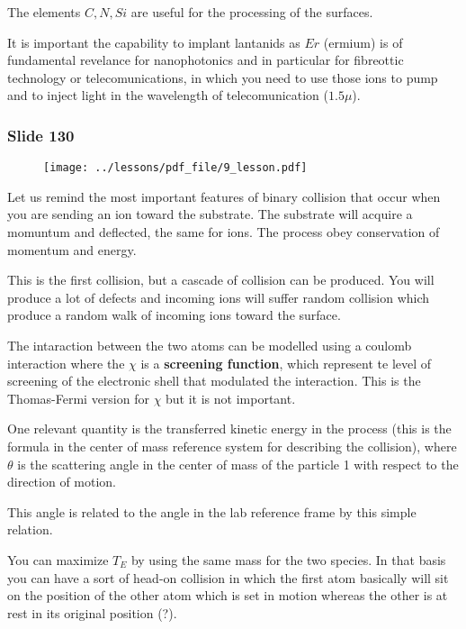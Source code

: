 \documentclass[../main/main.tex]{subfiles}
\begin{document}
The elements \( C,N,Si \) are useful for the processing of the surfaces.

It is important the capability to implant lantanids as \( Er \) (ermium) is of fundamental revelance for nanophotonics and in particular for fibreottic technology or telecomunications, in which you need to use those ions to pump and to inject light in the wavelength of telecomunication (\( 1.5 \mu \)).

\newpage

\subsubsection{Slide 130}

\begin{figure}[h!]
\centering
\texttt{[image: ../lessons/pdf\_file/9\_lesson.pdf]}
\end{figure}

Let us remind the most important features of binary collision that occur when you are sending an ion toward the substrate. The substrate will acquire a momuntum and deflected, the same for ions. The process obey conservation of momentum and energy.

This is the first collision, but a cascade of collision can be produced. You will produce a lot of defects and incoming ions will suffer random collision which produce a random walk of incoming ions toward the surface.

The intaraction between the two atoms can be modelled using a coulomb interaction where the \( \chi  \) is a \textbf{screening function}, which represent te level of screening of the electronic shell that modulated the interaction.
This is the Thomas-Fermi version for \( \chi  \) but it is not important.

One relevant quantity is the transferred kinetic energy in the process (this is the formula in the center of mass reference system for describing the collision), where \( \theta  \) is the scattering angle in the center of mass of the particle 1 with respect to the direction of motion.

This angle is related to the angle in the lab reference frame by this simple relation.

You can maximize \( T_E \) by using the same mass for the two species. In that basis you can have a sort of head-on collision in which the first atom basically will sit on the position of the other atom which is set in motion whereas the other is at rest in its original position (?).
\end{document}
